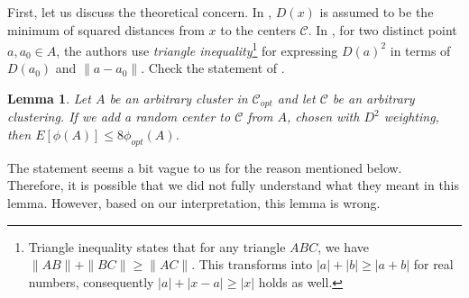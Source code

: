 \documentclass[12pt]{article}
\newtheorem{lemma}{Lemma}
\newcommand{\C}{\mathcal{C}}
\begin{document}
	First, let us discuss the theoretical concern. In \textcite{arthur_vassilvitskii_2007}, $D(x)$ is assumed to be the minimum of squared distances  from $x$ to the centers $\C$. In \textcite[Lemma $3.3$, section $3$]{arthur_vassilvitskii_2007}, for two distinct point $a,a_0\in A$, the authors use \textit{triangle inequality}\footnote{Triangle inequality states that for any triangle $ABC$, we have $\|AB\|+\|BC\|\geq \|AC\|$. This transforms into $|a|+|b|\geq |a+b|$ for real numbers, consequently $|a|+|x-a|\geq |x|$ holds as well.} for expressing $D(a)^2$ in terms of $D(a_0)$ and $\|a-a_0\|$. Check the statement of \textcite[Lemma $3.3$]{arthur_vassilvitskii_2007}.
		\begin{lemma}
			Let $A$ be an arbitrary cluster in $\C_{opt}$ and let $\C$ be an arbitrary clustering. If we add a random center to $\C$ from $A$, chosen with $D^2$ weighting, then $E[\phi(A)] \leq 8\phi_{opt}(A)$.
		\end{lemma}
	The statement seems a bit vague to us for the reason mentioned below. Therefore, it is possible that we did not fully understand what they meant in this lemma. However, based on our interpretation, this lemma is wrong.
\end{document}
